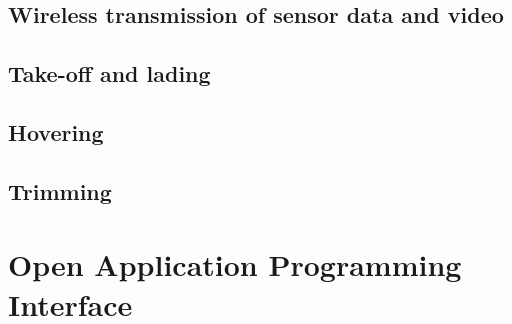 \subsection{Wireless transmission of sensor data and video}

\subsection{Take-off and lading}

\subsection{Hovering}

\subsection{Trimming}










	

\section{Open Application Programming Interface}


